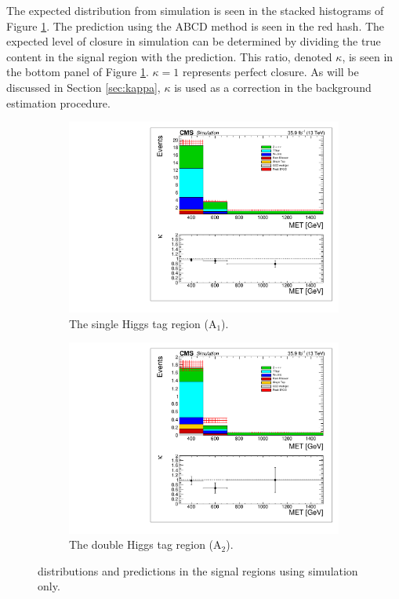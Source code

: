 The expected \ptmiss distribution from simulation is seen in the stacked histograms of Figure \ref{fig:mcclosure}. The prediction using the ABCD method is seen in the red hash. The expected level of closure in simulation can be determined by dividing the true content in the signal region with the prediction. This ratio, denoted $\kappa$, is seen in the bottom panel of Figure \ref{fig:mcclosure}. $\kappa=1$ represents perfect closure. As will be discussed in Section \ref{sec:kappa}, $\kappa$ is used as a correction in the background estimation procedure.

\begin{figure}[hbp!]
\begin{subfigure}[b]{0.5\textwidth}
\centering
\includegraphics[trim={5px 5px 5px 5px},clip,width=\textwidth]{figs/MCclosure_singleHiggsRegionTotal.pdf}
\caption{The single Higgs tag region (A$_{1}$).}
\end{subfigure}
\begin{subfigure}[b]{0.5\textwidth}
\centering
\includegraphics[trim={5px 5px 5px 5px},clip,width=\textwidth]{figs/MCclosure_doubleHiggsRegionTotal.pdf} 
\caption{The double Higgs tag region (A$_{2}$).}
\end{subfigure}
\caption{\ptmiss distributions and predictions in the signal regions using simulation only.}
\label{fig:mcclosure}
\end{figure}

